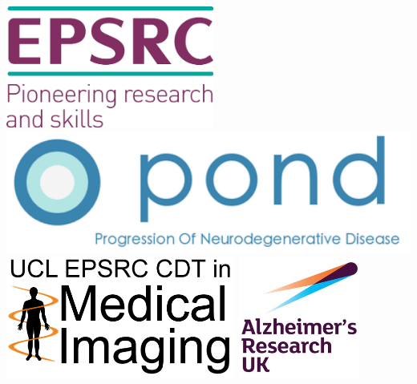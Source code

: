 \documentclass[portrait,a0,final,19pt]{a0poster}
\begin{document}
\begin{multicols}{2}
\vspace{1em}
\includegraphics[height=4.0cm]{epsrc_logo.jpg}
\hspace{0.5em}
\includegraphics[height=4.0cm]{pondLogo.png} 
\hspace{0.5em}
\includegraphics[height=4cm]{cdt_logo.png} 
\hspace{0.5em}
\includegraphics[height=4cm]{aruk_logo} 


\end{multicols}
\end{document}

